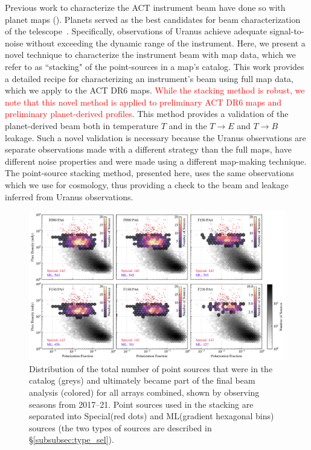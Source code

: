 Previous work to characterize the ACT instrument beam have done so with planet maps (\cite{hasselfield_atacama_2013,louis_2017,naess_2014}).  Planets served as the best candidates for beam characterization of the telescope~\cite{Lungu_2022}.  Specifically, observations of Uranus achieve adequate signal-to-noise without exceeding the dynamic range of the instrument.  Here, we present a novel technique to characterize the instrument beam with map data, which we refer to as ``stacking" of the point-sources in a map's catalog.  This work provides a detailed recipe for characterizing an instrument's beam using full map data, which we apply to the ACT DR6 maps.  \textcolor{red}{While the stacking method is robust, we note that this novel method is applied to preliminary ACT DR6 maps and preliminary planet-derived profiles}.  This method provides a validation of the planet-derived beam both in temperature $T$ and in the $T\rightarrow E$ and $T\rightarrow B$ leakage.  Such a novel validation is necessary because the Uranus observations are separate observations made with a different strategy than the full maps, have different noise properties and were made using a different map-making technique.  The point-source stacking method, presented here, uses the same observations which we use for cosmology, thus providing a check to the beam and leakage inferred from Uranus observations.

\begin{figure}[t]
\vspace{1em}
    \centering
    \includegraphics[width=\linewidth]{Figures/pt_src_dist.png}
    \caption{Distribution of the total number of point sources that were in the catalog (greys) and ultimately became part of the final beam analysis (colored) for all arrays combined, shown by observing seasons from 2017--21.  Point sources used in the stacking are separated into Special(red dots) and ML(gradient hexagonal bins) sources (the two types of sources are described in \S\ref{subsubsec:type_sel}).
    }
    \label{fig:ptsrc_select}
    \vspace{1em}
\end{figure}

